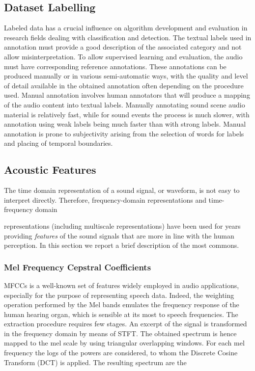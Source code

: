 \subsection{Dataset Labelling}
Labeled data has a crucial influence on algorithm development and evaluation in
research fields dealing with classification and detection. The textual labels used
in annotation must provide a good description of the associated category and not
allow misinterpretation. To allow supervised learning and evaluation, the audio must have corresponding
reference annotations. These annotations can be produced manually or in various
semi-automatic ways, with the quality and level of detail available in the obtained
annotation often depending on the procedure used. Manual annotation involves
human annotators that will produce a mapping of the audio content into textual
labels. Manually annotating sound scene audio material is relatively fast, while for
sound events the process is much slower, with annotation using weak labels being
much faster than with strong labels. Manual annotation is prone to subjectivity
arising from the selection of words for labels and placing of temporal boundaries.

\subsection{Acoustic Features}
\label{ssec:ac_features}
The time domain representation of a sound signal, or waveform, is not easy to
interpret directly. Therefore, frequency-domain representations and time-frequency domain

representations (including multiscale representations) have been used for years
providing \textit{features} of the sound signals that are more in line with the human
perception. In this section we report a brief description of the most commons.

\subsubsection{Mel Frequency Cepstral Coefficients}
MFCCs is a well-known set of features widely employed in audio applications, especially for the purpose of representing speech data. Indeed, the weighting operation performed by the Mel bands emulates the frequency response of
the human hearing organ, which is sensible at its most to speech frequencies.
The extraction procedure requires few stages. An excerpt of the signal is
 transformed in the frequency domain by means of STFT. The obtained spectrum is hence mapped to the mel scale by using triangular overlapping windows.
For each mel frequency the logs of the powers are considered, to whom the Discrete Cosine Transform (DCT) is applied. The resulting spectrum are the

